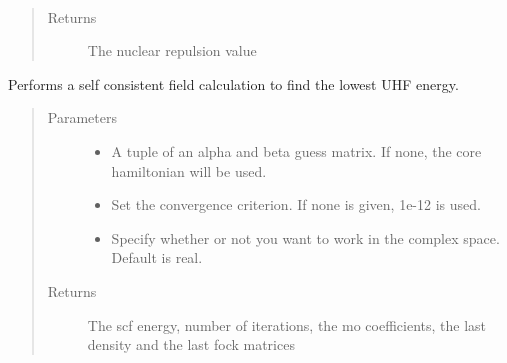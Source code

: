 \documentclass[letterpaper,10pt,english]{sphinxmanual}
\begin{document}
\begin{fulllineitems}
\begin{fulllineitems}
\begin{quote}
\begin{description}
\end{description}\end{quote}

\end{fulllineitems}


\begin{fulllineitems}
\label{\detokenize{UHF:hf.UHF.UHF.nuc_rep}}~\begin{quote}\begin{description}
\item[{Returns}] \leavevmode
The nuclear repulsion value

\end{description}\end{quote}

\end{fulllineitems}


\begin{fulllineitems}
\label{\detokenize{UHF:hf.UHF.UHF.scf}}
Performs a self consistent field calculation to find the lowest UHF energy.
\begin{quote}\begin{description}
\item[{Parameters}] \leavevmode\begin{itemize}
\item {} 
 \textendash{} A tuple of an alpha and beta guess matrix. If none, the core hamiltonian will be used.

\item {} 
 \textendash{} Set the convergence criterion. If none is given, 1e-12 is used.

\item {} 
 \textendash{} Specify whether or not you want to work in the complex space. Default is real.

\end{itemize}

\item[{Returns}] \leavevmode
The scf energy, number of iterations, the mo coefficients, the last density and the last fock matrices


\end{description}
\end{quote}
\end{fulllineitems}
\end{fulllineitems}
\end{document}
